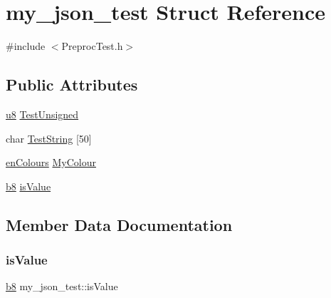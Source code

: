 \hypertarget{structmy__json__test}{}\section{my\+\_\+json\+\_\+test Struct Reference}
\label{structmy__json__test}


{\ttfamily \#include $<$Preproc\+Test.\+h$>$}

\subsection*{Public Attributes}
\begin{DoxyCompactItemize}
\item 
\hyperlink{ab__common_8h_a92c50087ca0e64fa93fc59402c55f8ca}{u8} \hyperlink{structmy__json__test_a0ea8af0c0061131955753275ad70dba4}{Test\+Unsigned}
\item 
char \hyperlink{structmy__json__test_a497da009ff7ce7742cf99571b0752227}{Test\+String} \mbox{[}50\mbox{]}
\item 
\hyperlink{PreprocTest_8h_a081cf1a0e70d6e2bd48c98f457742877}{en\+Colours} \hyperlink{structmy__json__test_a6f1212d5aaf1f688e8887d5614d510ca}{My\+Colour}
\item 
\hyperlink{ab__common_8h_a70e369648385b50f2d0588e8e8745275}{b8} \hyperlink{structmy__json__test_a55bffca96cce85232e33fc0c619a9eab}{is\+Value}
\end{DoxyCompactItemize}


\subsection{Member Data Documentation}
\mbox{\label{structmy__json__test_a55bffca96cce85232e33fc0c619a9eab}} 
\subsubsection{\texorpdfstring{is\+Value}{isValue}}
{\footnotesize\ttfamily \hyperlink{ab__common_8h_a70e369648385b50f2d0588e8e8745275}{b8} my\+\_\+json\+\_\+test\+::is\+Value}

\mbox{\label{structmy__json__test_a6f1212d5aaf1f688e8887d5614d510ca}} 
